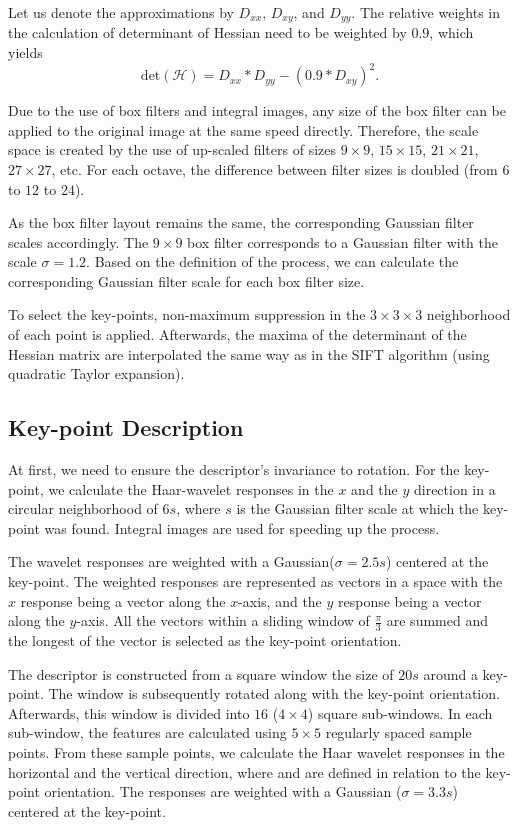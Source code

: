 Let us denote the approximations by $D_{xx}$, $D_{xy}$, and $D_{yy}$. The relative weights in the calculation of determinant of Hessian need to be weighted by $0.9$, which yields
\begin{equation}
    \text{det}(\mathcal{H}) = D_{xx} * D_{yy} - (0.9 * D_{xy})^{2}.
\end{equation}

Due to the use of box filters and integral images, any size of the box filter can be applied to the original image at the same speed directly. Therefore, the scale space is created by the use of up-scaled filters of sizes $9\times9$, $15\times15$, $21\times21$, $27\times27$, etc. For each octave, the difference between filter sizes is doubled (from $6$ to $12$ to $24$).

As the box filter layout remains the same, the corresponding Gaussian filter scales accordingly. The $9\times9$ box filter corresponds to a Gaussian filter with the scale $\sigma = 1.2$. Based on the definition of the process, we can calculate the corresponding Gaussian filter scale for each box filter size.

To select the key-points, non-maximum suppression in the $3\times3\times3$ neighborhood of each point is applied. Afterwards, the maxima of the determinant of the Hessian matrix are interpolated the same way as in the SIFT algorithm (using quadratic Taylor expansion).

\subsection{Key-point Description}
At first, we need to ensure the descriptor's invariance to rotation. For the key-point, we calculate the Haar-wavelet responses in the $x$ and the $y$ direction in a circular neighborhood of $6s$, where $s$ is the Gaussian filter scale at which the key-point was found. Integral images are used for speeding up the process.

The wavelet responses are weighted with a Gaussian($\sigma = 2.5 s$) centered at the key-point. The weighted responses are represented as vectors in a space with the $x$ response being a vector along the $x$-axis, and the $y$ response being a vector along the $y$-axis. All the vectors within a sliding window of $\frac{\pi}{3}$ are summed and the longest of the vector is selected as the key-point orientation.

The descriptor is constructed from a square window the size of $20s$ around a key-point. The window is subsequently rotated along with the key-point orientation. Afterwards, this window is divided into $16$ ($4\times4$) square sub-windows. In each sub-window, the features are calculated using $5\times5$ regularly spaced sample points. From these sample points, we calculate the Haar wavelet responses in the horizontal and the vertical direction, where  and  are defined in relation to the key-point orientation. The responses are weighted with a Gaussian ($\sigma = 3.3s$) centered at the key-point.

